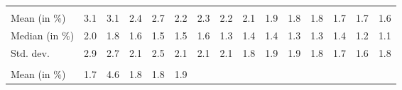 \begin{tabular}{lllllllllllllll}
  \multicolumn{1}{r}{} &
  \multicolumn{1}{r}{} &
  \multicolumn{1}{r}{} &
  \multicolumn{1}{r}{} &
  \multicolumn{1}{r}{} &
  \multicolumn{1}{r}{} &
  \multicolumn{1}{r}{} &
  \multicolumn{1}{r}{} &
  \multicolumn{1}{r}{} &
  \multicolumn{1}{r}{} \\
\multicolumn{1}{l}{\hspace{2em}Mean (in $\%$)} &
  \multicolumn{1}{|r}{3.1} &
  \multicolumn{1}{r}{3.1} &
  \multicolumn{1}{r}{2.4} &
  \multicolumn{1}{r}{2.7} &
  \multicolumn{1}{r}{2.2} &
  \multicolumn{1}{r}{2.3} &
  \multicolumn{1}{r}{2.2} &
  \multicolumn{1}{r}{2.1} &
  \multicolumn{1}{r}{1.9} &
  \multicolumn{1}{r}{1.8} &
  \multicolumn{1}{r}{1.8} &
  \multicolumn{1}{r}{1.7} &
  \multicolumn{1}{r}{1.7} &
  \multicolumn{1}{r}{1.6} \\
\multicolumn{1}{l}{\hspace{2em}Median (in $\%$)} &
  \multicolumn{1}{|r}{2.0} &
  \multicolumn{1}{r}{1.8} &
  \multicolumn{1}{r}{1.6} &
  \multicolumn{1}{r}{1.5} &
  \multicolumn{1}{r}{1.5} &
  \multicolumn{1}{r}{1.6} &
  \multicolumn{1}{r}{1.3} &
  \multicolumn{1}{r}{1.4} &
  \multicolumn{1}{r}{1.4} &
  \multicolumn{1}{r}{1.3} &
  \multicolumn{1}{r}{1.3} &
  \multicolumn{1}{r}{1.4} &
  \multicolumn{1}{r}{1.2} &
  \multicolumn{1}{r}{1.1} \\
\multicolumn{1}{l}{\hspace{2em}Std. dev.} &
  \multicolumn{1}{|r}{2.9} &
  \multicolumn{1}{r}{2.7} &
  \multicolumn{1}{r}{2.1} &
  \multicolumn{1}{r}{2.5} &
  \multicolumn{1}{r}{2.1} &
  \multicolumn{1}{r}{2.1} &
  \multicolumn{1}{r}{2.1} &
  \multicolumn{1}{r}{1.8} &
  \multicolumn{1}{r}{1.9} &
  \multicolumn{1}{r}{1.9} &
  \multicolumn{1}{r}{1.8} &
  \multicolumn{1}{r}{1.7} &
  \multicolumn{1}{r}{1.6} &
  \multicolumn{1}{r}{1.8} \\
\multicolumn{1}{l}{\hspace{1em}{\textit{Additive term} ($\widehat{t}/\widetilde{p}$)}} &
  \multicolumn{1}{|r}{} &
  \multicolumn{1}{r}{} &
  \multicolumn{1}{r}{} &
  \multicolumn{1}{r}{} &
  \multicolumn{1}{r}{} &
  \multicolumn{1}{r}{} &
  \multicolumn{1}{r}{} &
  \multicolumn{1}{r}{} &
  \multicolumn{1}{r}{} &
  \multicolumn{1}{r}{} &
  \multicolumn{1}{r}{} &
  \multicolumn{1}{r}{} &
  \multicolumn{1}{r}{} &
  \multicolumn{1}{r}{} \\
\multicolumn{1}{l}{\hspace{2em}Mean (in $\%$)} &
  \multicolumn{1}{|r}{1.7} &
  \multicolumn{1}{r}{4.6} &
  \multicolumn{1}{r}{1.8} &
  \multicolumn{1}{r}{1.8} &
  \multicolumn{1}{r}{1.9} &

\end{tabular}
